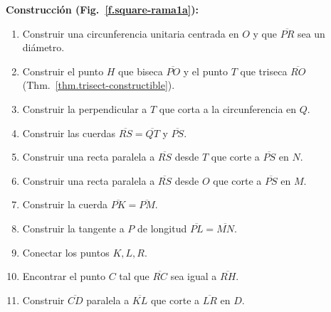 \textbf{Construcción (Fig.~\ref{f.square-rama1a}):}
\begin{enumerate}

\item Construir una circunferencia unitaria centrada en $O$ y que $\overline{PR}$ sea un diámetro.

\item Construir el punto $H$ que biseca $\overline{PO}$ y el punto $T$ que triseca $\overline{RO}$ (Thm.~\ref{thm.trisect-constructible}).

\item Construir la perpendicular a $T$ que corta a la circunferencia en $Q$.

\item Construir las cuerdas $\overline{RS}=\overline{QT}$ y $\overline{PS}$.

\item Construir una recta paralela a $\overline{RS}$ desde $T$ que corte a $\overline{PS}$ en $N$.

\item Construir una recta paralela a $\overline{RS}$ desde $O$ que corte a $\overline{PS}$ en $M$.

\item Construir la cuerda $\overline{PK}=\overline{PM}$.

\item Construir la tangente a $P$ de longitud $\overline{PL}=\overline{MN}$.

\item Conectar los puntos $K,L,R$.

\item Encontrar el punto $C$ tal que $\overline{RC}$ sea igual a $\overline{RH}$.

\item Construir $\overline{CD}$ paralela a $\overline{KL}$ que corte a $\overline{LR}$ en $D$. 
\end{enumerate}

